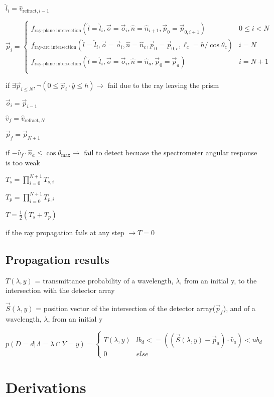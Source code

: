 \documentclass{article}
\begin{document}
$\hat{l}_i = \hat{v}_{\text{refract}, i - 1}$

\[\vec{p}_i = \begin{cases}
f_{\text{ray-plane intersection}}(\hat{l}=\hat{l}_i, \vec{o}=\vec{o}_i, \hat{n}=\hat{n}_{i+1}, \vec{p}_0=\vec{p}_{0, i+1}) & 0 \le i < N \\
f_{\text{ray-arc intersection}}(\hat{l}=\hat{l}_i, \vec{o}=\vec{o}_i, \hat{n}=\hat{n}_c, \vec{p}_0=\vec{p}_{0, c}, \ell_c=h/\cos{\theta_{c}}) & i = N \\
f_{\text{ray-plane intersection}}(\hat{l}=\hat{l}_i, \vec{o}=\vec{o}_i, \hat{n}=\hat{n}_{a}, \vec{p}_0=\vec{p}_a) & i = N + 1 \\
\end{cases}\]

if $\exists \vec{p}_{i \le N}, \neg (0 \le \vec{p}_i \cdot \hat{y} \le h) \to$ fail due to the ray leaving the prism

$\vec{o}_i = \vec{p}_{i - 1}$

$\hat{v}_f = \hat{v}_{\text{refract}, N}$

$\vec{p}_f = \vec{p}_{N + 1}$

if $-\hat{v}_f \cdot \hat{n}_a \le \cos{\theta_{\text{max}}} \to$ fail to detect becuase the spectrometer angular response is too weak

$T_s = \prod_{i=0}^{N + 1} T_{s,i}$

$T_p = \prod_{i=0}^{N + 1} T_{p,i}$

$T = \frac{1}{2} (T_s + T_p)$

if the ray propagation fails at any step $\to T = 0$


\subsection{Propagation results}
$T(\lambda, y)$ = transmittance probability of a wavelength, $\lambda$, from an initial y, to the intersection with the detector array

$\vec{S}(\lambda, y)$ = position vector of the intersection of the detector array($\vec{p}_f$), and of a wavelength, $\lambda$, from an initial y

$$p(D=d|\Lambda=\lambda \cap Y=y) = \begin{cases}
T(\lambda, y) & lb_d <= ((\vec{S}(\lambda, y) - \vec{p}_a) \cdot \hat{v}_a) < ub_d \\
0 & else \end{cases}$$


\section{Derivations}\label{sec:derivations}
\end{document}
